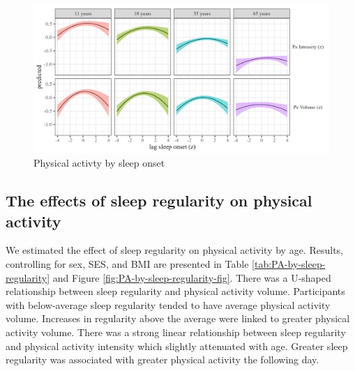 \documentclass[
  man]{apa6}
\begin{document}
\begin{figure}
\includegraphics[width=1.1\linewidth]{../Figures/Pa on sleep_onset_lag} \caption{Physical activty by sleep onset}\label{fig:PA-by-sleep-onset-fig}
\end{figure}

\hypertarget{the-effects-of-sleep-regularity-on-physical-activity}{%
\subsection{The effects of sleep regularity on physical activity}\label{the-effects-of-sleep-regularity-on-physical-activity}}

We estimated the effect of sleep regularity on physical activity by age. Results, controlling for sex, SES, and BMI are presented in Table \ref{tab:PA-by-sleep-regularity} and Figure \ref{fig:PA-by-sleep-regularity-fig}. There was a U-shaped relationship between sleep regularity and physical activity volume. Participants with below-average sleep regularity tended to have average physical activity volume. Increases in regularity above the average were linked to greater physical activity volume. There was a strong linear relationship between sleep regularity and physical activity intensity which slightly attenuated with age. Greater sleep regularity was associated with greater physical activity the following day.
\end{document}
